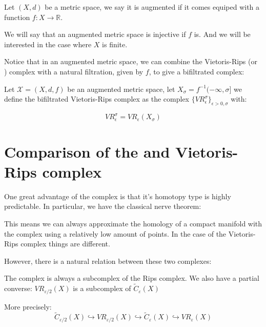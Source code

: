 \begin{definition}
Let $(X,d)$ be a metric space,
we say it is augmented if it comes equiped with a function 
$f:X\to\mathbb{R}$.

\end{definition}

We will say that an augmented metric space is injective if $f$ is.
And we will be interested in the case where $X$ is finite.

Notice that in an augmented metric space,
we can combine the Vietoris-Rips (or {\Cech}) complex 
with a natural filtration,
given by $f$,
to give a bifiltrated complex:

\begin{definition}

Let $\mathcal{X}=(X,d,f)$ be an augmented metric space,
let $X_\sigma=f^{-1}(-\infty,\sigma]$ we define the bifiltrated
Vietoris-Rips complex as the complex
$\{{VR}_\epsilon^\sigma\}_{\epsilon>0,\sigma}$
with:

$$
{VR}_\epsilon^\sigma=
{VR}_\epsilon(X_\sigma)
$$

\end{definition}

\section{Comparison of the {\Cech} and Vietoris-Rips complex}

One great advantage of the {\Cech} complex is that it's homotopy type is highly predictable.
In particular, we have the classical {\Cech} nerve theorem:

This means we can always approximate the homology of a compact
manifold with the {\Cech} complex using a relatively low amount of points.
In the case of the Vietoris-Rips complex things are different.


However, there is a natural relation between these two complexes:

\begin{proposition}
The {\Cech} complex is always a subcomplex of the Rips complex. 
We also have a partial converse:
$VR_{\varepsilon/2}(X)$ is a subcomplex of $\tilde C_{\varepsilon}(X)$

More precisely:
$$
\tilde C_{\varepsilon/2}(X)
\hookrightarrow
VR_{\varepsilon/2}(X)
\hookrightarrow
\tilde C_{\varepsilon}(X)
\hookrightarrow
VR_{\varepsilon}(X)
$$
\end{proposition}

